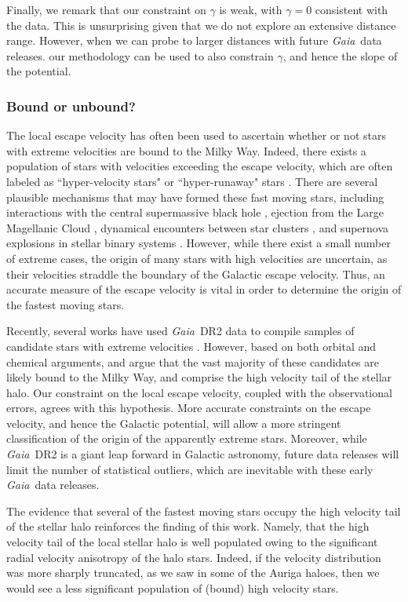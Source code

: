 \documentclass[fleqn,usenatbib]{mnras}
\newcommand{\gaia}		{\emph{Gaia}}
\begin{document}
Finally, we remark that our constraint on $\gamma$ is weak, with $\gamma=0$ consistent with the data. This is unsurprising given that we do not explore an extensive distance range. However, when we can probe to larger distances with future \gaia\ data releases. our methodology can be used to also constrain $\gamma$, and hence the slope of the potential.

\subsubsection{Bound or unbound?}
The local escape velocity has often been used to ascertain whether or not stars with extreme velocities are bound to the Milky Way. Indeed, there exists a population of stars with velocities exceeding the escape velocity, which are often labeled as ``hyper-velocity stars"  or ``hyper-runaway" stars \citep[see e.g.][]{brown15}. There are several plausible mechanisms that may have formed these fast moving stars, including interactions with the central supermassive black hole \citep[e.g.][]{hills88}, ejection from the Large Magellanic Cloud \citep[e.g.][]{boubert16}, dynamical encounters between star clusters \citep[e.g.][]{leonard90},  and supernova explosions in stellar binary systems \citep[e.g.][]{portegies00}. However, while there exist a small number of extreme cases, the origin of many stars with high velocities are uncertain, as their velocities straddle the boundary of the Galactic escape velocity. Thus, an accurate measure of the escape velocity is vital in order to determine the origin of the fastest moving stars.

Recently, several works have used \gaia\ DR2 data to compile samples of candidate stars with extreme velocities \citep[e.g.][]{bromley18, hattori18, marchetti18}. However, based on both orbital and chemical arguments, \cite{boubert18} and \cite{hawkins18} argue that the vast majority of these candidates are likely bound to the Milky Way, and comprise the high velocity tail of the stellar halo. Our constraint on the local escape velocity, coupled with the observational errors, agrees with this hypothesis. More accurate constraints on the escape velocity, and hence the Galactic potential, will allow a more stringent classification of the origin of the apparently extreme stars. Moreover, while \gaia\ DR2 is a giant leap forward in Galactic astronomy, future data releases will limit the number of statistical outliers, which are inevitable with these early \gaia\ data releases.

The evidence that several of the fastest moving stars occupy the high velocity tail of the stellar halo reinforces the finding of this work. Namely, that the high velocity tail of the local stellar halo is well populated owing to the significant radial velocity anisotropy of the halo stars. Indeed, if the velocity distribution was more sharply truncated, as we saw in some of the Auriga haloes, then we would see a less significant population of (bound) high velocity stars.
\end{document}
